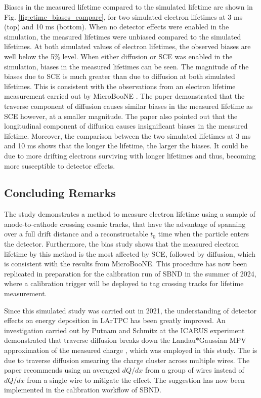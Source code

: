 Biases in the measured lifetime compared to the simulated lifetime are shown in Fig. \ref{fig:etime_biases_compare}, for two simulated electron lifetimes at 3 ms (top) and 10 ms (bottom).
When no detector effects were enabled in the simulation, the measured lifetimes were unbiased compared to the simulated lifetimes.
At both simulated values of electron lifetimes, the observed biases are well below the 5\% level.
When either diffusion or SCE was enabled in the simulation, biases in the measured lifetimes can be seen.
The magnitude of the biases due to SCE is much greater than due to diffusion at both simulated lifetimes.
This is consistent with the observations from an electron lifetime measurement carried out by MicroBooNE \cite{ubooneEtime}. 
The paper demonstrated that the traverse component of diffusion causes similar biases in the measured lifetime as SCE however, at a smaller magnitude.
The paper also pointed out that the longitudinal component of diffusion causes insignificant biases in the measured lifetime.
Moreover, the comparison between the two simulated lifetimes at 3 ms and 10 ms shows that the longer the lifetime, the larger the biases.
It could be due to more drifting electrons surviving with longer lifetimes and thus, becoming more susceptible to detector effects.

\subsection{Concluding Remarks}
\label{sec7:etime_remark}

The study demonstrates a method to measure electron lifetime using a sample of anode-to-cathode crossing cosmic tracks, that have the advantage of spanning over a full drift distance and a reconstructable $t_{0}$ time when the particle enters the detector.
Furthermore, the bias study shows that the measured electron lifetime by this method is the most affected by SCE, followed by diffusion, which is consistent with the results from MicroBooNE.
This procedure has now been replicated in preparation for the calibration run of SBND in the summer of 2024, where a calibration trigger will be deployed to tag crossing tracks for lifetime measurement.

Since this simulated study was carried out in 2021, the understanding of detector effects on energy deposition in LArTPC has been greatly improved.
An investigation carried out by Putnam and Schmitz at the ICARUS experiment demonstrated that traverse diffusion breaks down the Landau$*$Gaussian MPV approximation of the measured charge \cite{GrayDiffusion}, which was employed in this study.
The is due to traverse diffusion smearing the charge cluster across multiple wires.
The paper recommends using an averaged $dQ/dx$ from a group of wires instead of $dQ/dx$ from a single wire to mitigate the effect.
The suggestion has now been implemented in the calibration workflow of SBND.

